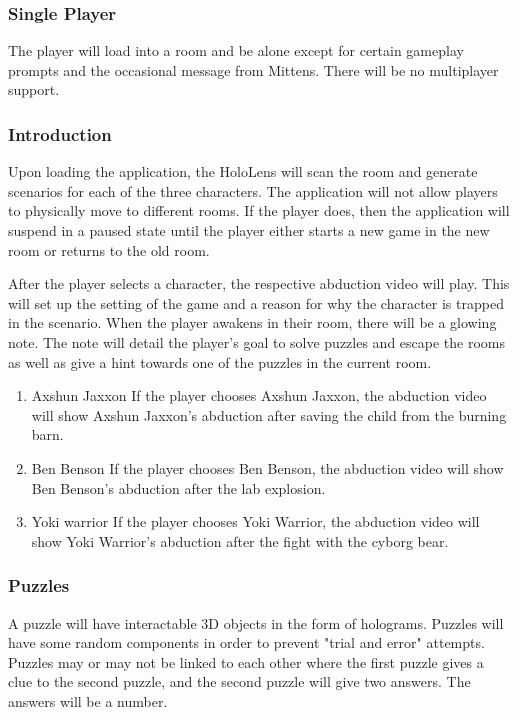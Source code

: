 \documentclass[11pt]{article}
\begin{document}
\subsubsection{Single Player}
\label{sec:org49d37b1}
The player will load into a room and be alone except for certain gameplay prompts and the occasional message from Mittens. There will be no multiplayer support.

\subsubsection{Introduction}
\label{sec:org60c511b}
Upon loading the application, the HoloLens will scan the room and generate scenarios for each of the three characters. The application will not allow players to physically move to different rooms. If the player does, then the application will suspend in a paused state until the player either starts a new game in the new room or returns to the old room.

After the player selects a character, the respective abduction video will play. This will set up the setting of the game and a reason for why the character is trapped in the scenario. When the player awakens in their room, there will be a glowing note. The note will detail the player's goal to solve puzzles and escape the rooms as well as give a hint towards one of the puzzles in the current room.

\begin{enumerate}
\item Axshun Jaxxon
\label{sec:orgd5c48d5}
If the player chooses Axshun Jaxxon, the abduction video will show Axshun Jaxxon's abduction after saving the child from the burning barn.

\item Ben Benson
\label{sec:org305ed32}
If the player chooses Ben Benson, the abduction video will show Ben Benson's abduction after the lab explosion.

\item Yoki warrior
\label{sec:org574fc8e}
If the player chooses Yoki Warrior, the abduction video will show Yoki Warrior's abduction after the fight with the cyborg bear.
\end{enumerate}

\subsubsection{Puzzles}
\label{sec:org7bca22d}
A puzzle will have interactable 3D objects in the form of holograms. Puzzles will have some random components in order to prevent "trial and error" attempts. Puzzles may or may not be linked to each other where the first puzzle gives a clue to the second puzzle, and the second puzzle will give two answers. The answers will be a number.
\end{document}
